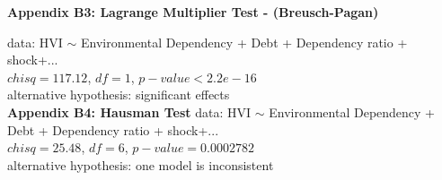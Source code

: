 \documentclass[12pt, a4paper]{article}
\begin{document}
\textbf{Appendix B3: Lagrange Multiplier Test - (Breusch-Pagan)}

data:  HVI $ \sim $ Environmental Dependency + Debt + Dependency ratio + shock+...\\
$chisq = 117.12$, $df = 1$, $p-value < 2.2e-16$\\
alternative hypothesis: significant effects\\

\textbf{Appendix B4: Hausman Test}
data:  HVI $ \sim $ Environmental Dependency + Debt + Dependency ratio + shock+...\\
$chisq = 25.48$, $df = 6$, $p-value = 0.0002782$\\
alternative hypothesis: one model is inconsistent\\
\end{document}
